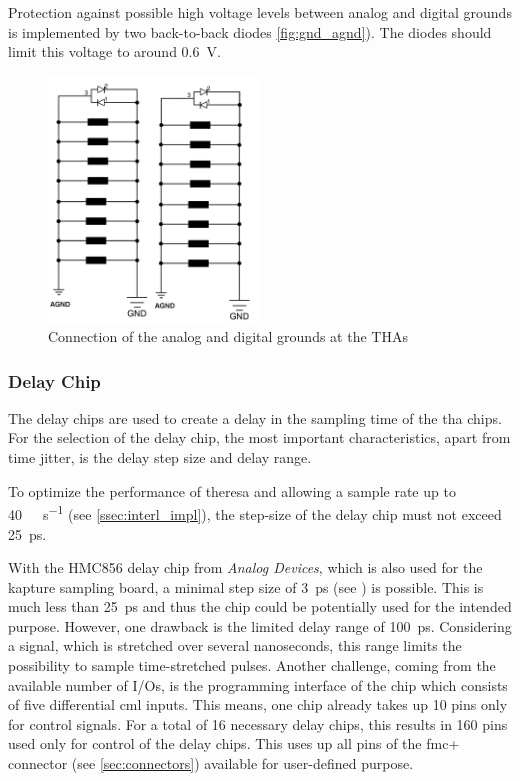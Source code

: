 Protection against possible high voltage levels between analog and digital grounds is implemented by two back-to-back diodes \autoref{fig:gnd_agnd}).
The diodes should limit this voltage to around \SI{0.6}{\volt}.

\begin{figure}[tb]
	\centering
	\includegraphics[width = 0.5\textwidth]{chap/04-theresa/img/schematic/gnd_agnd}
	\caption{Connection of the analog and digital grounds at the THAs}
	\label{fig:gnd_agnd}
\end{figure}

\subsubsection*{Delay Chip}
The delay chips are used to create a delay in the sampling time of the \gls{tha} chips. For the selection of the delay chip, the most important characteristics, apart from time jitter, is the delay step size and delay range. 

To optimize the performance of \gls{theresa} and allowing a sample rate up to \SI{40}{\giga\sample\per\second} (see \autoref{ssec:interl_impl}), the step-size of the delay chip must not exceed \SI{25}{\pico \second}.

With the HMC856 delay chip from \textit{Analog Devices}, which is also used for the \gls{kapture} sampling board, a minimal step size of \SI{3}{\pico\second} (see \cite{hmc856}) is possible.
This is much less than  \SI{25}{\pico \second} and thus the chip could be potentially used for the intended purpose.
However, one drawback is the limited delay range of \SI{100}{\pico\second}.
Considering a signal, which is stretched over several nanoseconds, this range limits the possibility to sample time-stretched pulses.
Another challenge, coming from the available number of I/Os, is the programming interface of the chip which consists of five differential \gls{cml} inputs.
This means, one chip already takes up 10 pins only for control signals.
For a total of 16 necessary delay chips, this results in 160 pins used only for control of the delay chips.
This uses up all pins of the \gls{fmc}+ connector (see \autoref{sec:connectors}) available for user-defined purpose. 


